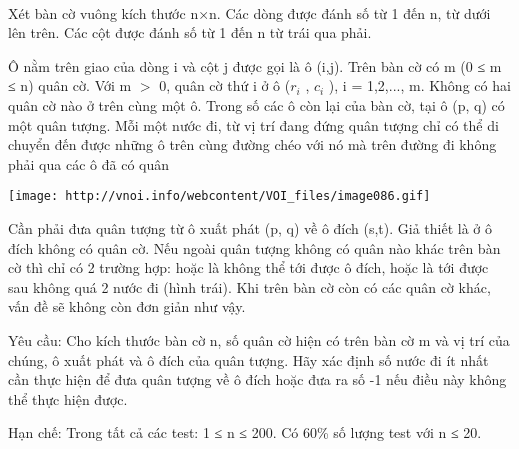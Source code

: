  

Xét bàn cờ vuông kích thước n×n. Các dòng được đánh số từ 1 đến n, từ dưới lên trên. Các cột được đánh số từ 1 đến n từ trái qua phải.

Ô nằm trên giao của dòng i và cột j được gọi là ô (i,j). Trên bàn cờ có m (0 ≤ m ≤ n) quân cờ. Với m $>$ 0, quân cờ thứ i ở ô ($r_{i}$ , $c_{i}$ ), i = 1,2,..., m. Không có hai quân cờ nào ở trên cùng một ô. Trong số các ô còn lại của bàn cờ, tại ô (p, q) có một quân tượng. Mỗi một nước đi, từ vị trí đang đứng quân tượng chỉ có thể di chuyển đến được những ô trên cùng đường chéo với nó mà trên đường đi không phải qua các ô đã có quân


\texttt{[image: http://vnoi.info/webcontent/VOI\_files/image086.gif]}

Cần phải đưa quân tượng từ ô xuất phát (p, q) về ô đích (s,t). Giả thiết là ở ô đích không có quân cờ. Nếu ngoài quân tượng không có quân nào khác trên bàn cờ thì chỉ có 2 trường hợp: hoặc là không thể tới được ô đích, hoặc là tới được sau không quá 2 nước đi (hình trái). Khi trên bàn cờ còn có các quân cờ khác, vấn đề sẽ không còn đơn giản như vậy.

Yêu cầu: Cho kích thước bàn cờ n, số quân cờ hiện có trên bàn cờ m và vị trí của chúng, ô xuất phát và ô đích của quân tượng. Hãy xác định số nước đi ít nhất cần thực hiện để đưa quân tượng về ô đích hoặc đưa ra số -1 nếu điều này không thể thực hiện được.

Hạn chế:
Trong tất cả các test: 1 ≤ n ≤ 200. Có 60\% số lượng test với n ≤ 20.